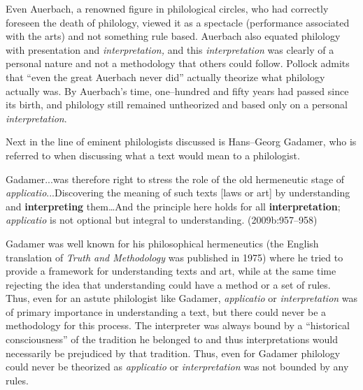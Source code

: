 Even Auerbach, a renowned figure in philological circles, who had correctly foreseen the death of philology, viewed it as a spectacle (performance associated with the arts) and not something rule based. Auerbach also equated philology with presentation and \textit{interpretation,} and this \textit{interpretation} was clearly of a personal nature and not a methodology that others could follow. Pollock admits that “even the great Auerbach never did” actually theorize what philology actually was. By Auerbach’s time, one–hundred and fifty years had passed since its birth, and philology still remained untheorized and based only on a personal \textit{interpretation}.

\newpage

Next in the line of eminent philologists discussed is Hans–Georg Gadamer, who is referred to when discussing what a text would mean to a philologist.

\begin{myquote}
Gadamer...was therefore right to stress the role of the old hermeneutic stage of \textit{applicatio}...Discovering the meaning of such texts [laws or art] by understanding and \textbf{interpreting} them…And the principle here holds for all \textbf{interpretation}; \textit{applicatio} is not optional but integral to understanding. (2009b:957–958)
\end{myquote}

Gadamer was well known for his philosophical hermeneutics (the English translation of \textit{Truth and Methodology} was published in 1975) where he tried to provide a framework for understanding texts and art, while at the same time rejecting the idea that understanding could have a method or a set of rules. Thus, even for an astute philologist like Gadamer, \textit{applicatio} or \textit{interpretation} was of primary importance in understanding a text, but there could never be a methodology for this process. The interpreter was always bound by a “historical consciousness” of the tradition he belonged to and thus interpretations would necessarily be prejudiced by that tradition. Thus, even for Gadamer philology could never be theorized as \textit{applicatio} or \textit{interpretation} was not bounded by any rules.

